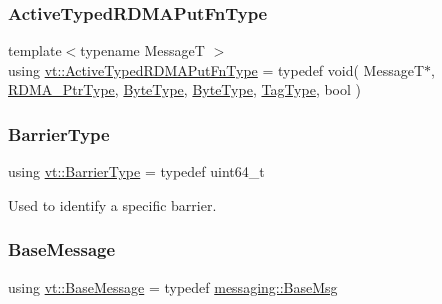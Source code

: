 \mbox{\label{namespacevt_a881ee9bd1e4e71905da1f563ee26ce25}} 
\subsubsection{\texorpdfstring{Active\+Typed\+R\+D\+M\+A\+Put\+Fn\+Type}{ActiveTypedRDMAPutFnType}}
{\footnotesize\ttfamily template$<$typename MessageT $>$ \\
using \hyperlink{namespacevt_a881ee9bd1e4e71905da1f563ee26ce25}{vt\+::\+Active\+Typed\+R\+D\+M\+A\+Put\+Fn\+Type} = typedef void( MessageT$\ast$, \hyperlink{namespacevt_a9e2c953286c7616f7c218e9951790776}{R\+D\+M\+A\+\_\+\+Ptr\+Type}, \hyperlink{namespacevt_aab8d55968084610ce3b17057981e9300}{Byte\+Type}, \hyperlink{namespacevt_aab8d55968084610ce3b17057981e9300}{Byte\+Type}, \hyperlink{namespacevt_a84ab281dae04a52a4b243d6bf62d0e52}{Tag\+Type}, bool )}

\mbox{\label{namespacevt_a25e481f0d6bbc7204db23d1c87a62e77}} 
\subsubsection{\texorpdfstring{Barrier\+Type}{BarrierType}}
{\footnotesize\ttfamily using \hyperlink{namespacevt_a25e481f0d6bbc7204db23d1c87a62e77}{vt\+::\+Barrier\+Type} = typedef uint64\+\_\+t}



Used to identify a specific barrier. 

\mbox{\label{namespacevt_ac34f95a5e2b8109b55bfba52b074443d}} 
\subsubsection{\texorpdfstring{Base\+Message}{BaseMessage}}
{\footnotesize\ttfamily using \hyperlink{namespacevt_ac34f95a5e2b8109b55bfba52b074443d}{vt\+::\+Base\+Message} = typedef \hyperlink{structvt_1_1messaging_1_1_base_msg}{messaging\+::\+Base\+Msg}}



